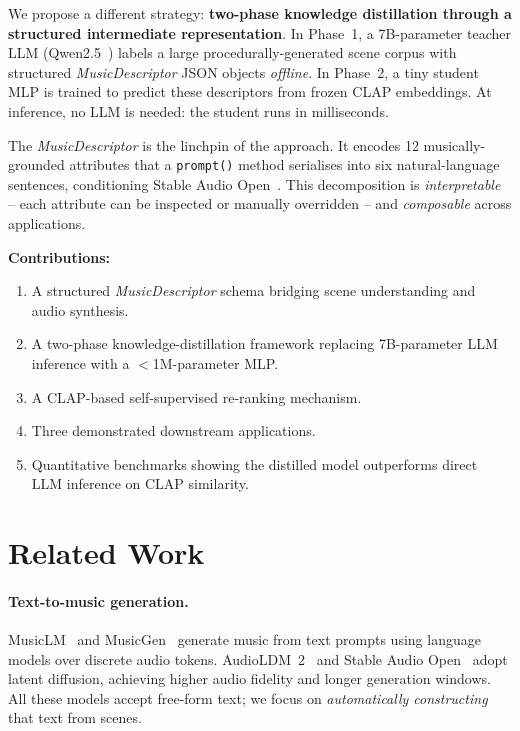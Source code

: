 \documentclass[10pt,twocolumn,letterpaper]{article}
\begin{document}
We propose a different strategy: \textbf{two-phase knowledge distillation
through a structured intermediate representation}. In Phase~1, a 7B-parameter teacher LLM (Qwen2.5~\cite{qwen2025qwen25}) labels a large procedurally-generated scene corpus with structured \emph{MusicDescriptor} JSON objects \emph{offline}. In Phase~2, a tiny student MLP is trained to predict these descriptors from frozen CLAP embeddings. At inference, no LLM is needed: the student runs in milliseconds.

The \emph{MusicDescriptor} is the linchpin of the approach.
It encodes 12 musically-grounded attributes that a \texttt{prompt()} method
serialises into six natural-language sentences, conditioning Stable Audio
Open~\cite{evans2024stable}.
This decomposition is \emph{interpretable} -- each attribute can be inspected or manually overridden -- and \emph{composable} across applications.

\noindent\textbf{Contributions:}
\begin{enumerate}
  \item A structured \emph{MusicDescriptor} schema bridging scene understanding
        and audio synthesis.
  \item A two-phase knowledge-distillation framework replacing 7B-parameter LLM
        inference with a $<$1M-parameter MLP.
  \item A CLAP-based self-supervised re-ranking mechanism.
  \item Three demonstrated downstream applications.
  \item Quantitative benchmarks showing the distilled model outperforms direct
        LLM inference on CLAP similarity.
\end{enumerate}

\section{Related Work}
\label{sec:related}

\paragraph{Text-to-music generation.}
MusicLM~\cite{agostinelli2023musiclm} and MusicGen~\cite{copet2023simple}
generate music from text prompts using language models over discrete audio
tokens.
AudioLDM~2~\cite{liu2023audioldm2} and Stable Audio Open~\cite{evans2024stable}
adopt latent diffusion, achieving higher audio fidelity and longer generation
windows.
All these models accept free-form text; we focus on \emph{automatically
constructing} that text from scenes.
\end{document}
